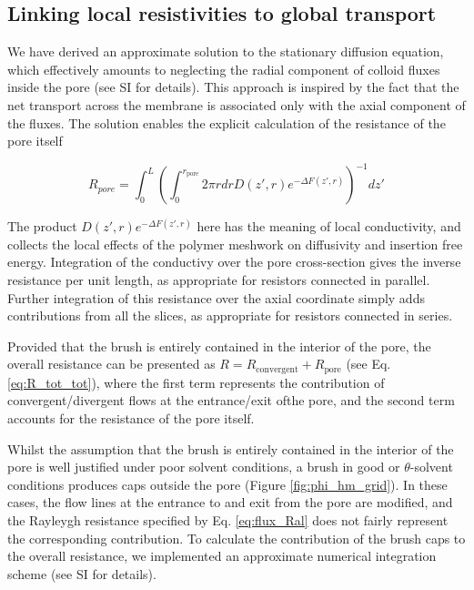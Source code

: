 \documentclass[12pt, a4paper]{article}
\begin{document}

\subsection{Linking local resistivities to global transport}

We have derived an approximate solution to the stationary diffusion equation, 
which effectively amounts to neglecting the radial component of colloid fluxes inside the pore (see SI for details). 
This approach is inspired by the fact that the net transport across the membrane is associated only with the axial component of the fluxes. 
The solution enables the explicit calculation of the resistance of the pore itself

\begin{equation}
    R_{pore}=\int_{0}^{L}\left(\int_{0}^{r_{\text{pore}}}2\pi rdrD(z',r)e^{-\Delta F(z',r)}\right)^{-1}dz'
    \label{eq:res_with_brush}
\end{equation}
    
\noindent The product $D(z',r)e^{-\Delta F(z',r)}$ here has the meaning of local conductivity, 
and collects the local effects of the polymer meshwork on diffusivity and insertion free energy. 
Integration of the conductivy over the pore cross-section gives the inverse resistance per unit length, as appropriate for resistors connected in parallel.
Further integration of this resistance over the axial coordinate simply adds contributions from all the slices, as appropriate for resistors connected in series. 

Provided that the brush is entirely contained in the interior of the pore, 
the overall resistance can be presented as $R=R_{\text{convergent}}+ R_{\text{pore}}$ (see Eq. \ref{eq:R_tot_tot}),
where the first term represents the contribution of convergent/divergent flows at the entrance/exit ofthe pore, 
and the second term accounts for the resistance of the pore itself.

Whilst the assumption that the brush is entirely contained in the interior of the pore is well justified under poor solvent conditions, 
a brush in good or $\theta$-solvent conditions produces caps outside the pore (Figure \ref{fig:phi_hm_grid}). 
In these cases, the flow lines at the entrance to and exit from the pore are modified, 
and the Rayleygh resistance specified by Eq. \ref{eq:flux_Ral} does not fairly represent the corresponding contribution. 
To calculate the contribution of the brush caps to the overall resistance, we implemented an approximate numerical integration scheme (see SI for details).
\end{document}

